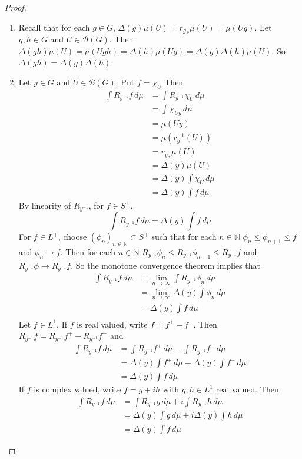 \documentclass[12pt]{amsart}
\theoremstyle{definition}
\newcommand{\Del}{\Delta}
\newcommand{\N}{\mathbb{N}}
\newcommand{\MB}{\mathcal{B}}
\newcommand{\dmu}{\, d \mu}
\newcommand{\limn}{\lim \limits_{n \rightarrow \infty}}
\newcommand{\seq}[2]{(#1_{#2})_{#2 \in \N}}
\begin{document}
	\begin{proof}\
		\begin{enumerate}
			\item Recall that for each $g \in G$, $\Del(g)\mu(U) = {r_g}_*\mu(U) = \mu(Ug)$. Let $g, h \in G$ and $U \in \MB(G)$. Then $\Del(gh)\mu(U) = \mu(Ugh) = \Del(h)\mu(Ug) = \Del(g) \Del(h)\mu(U)$. So $\Del(gh) = \Del(g) \Del(h)$.
			\item Let $y \in G$ and $U \in \MB(G)$. Put $f = \chi_U$ Then 
			\begin{align*}
				\int R_{y^{-1}} f \dmu 
				& = \int R_{y^{-1}} \chi_U \dmu \\
				& = \int \chi_{Uy} \dmu \\
				& = \mu(Uy) \\
				&= \mu(r_y^{-1}(U)) \\
				&= {r_y}_* \mu(U) \\
				& = \Del(y) \mu(U) \\
				& = \Del(y)  \int \chi_U \dmu \\
				&= \Del(y)  \int f \dmu
			\end{align*}
			By linearity of $R_{y^{-1}}$, for $f \in S^+$, $$\int R_{y^{-1}} f \dmu = \Del(y) \int f \dmu$$
			For $f \in L^+$, choose $\seq{\phi}{n} \subset S^+$ such that for each $n \in \N$ $\phi_n \leq \phi_{n+1} \leq f$ and $\phi_n \rightarrow f$. Then for each $n \in \N$ $R_{y^{-1}} \phi_n \leq R_{y^{-1}} \phi_{n+1} \leq R_{y^{-1}} f$ and $R_{y^{-1}} \phi \rightarrow R_{y^{-1}} f$. So the monotone convergence theorem implies that 
			\begin{align*}
				\int R_{y^{-1}} f \dmu 
				& = \limn \int R_{y^{-1}} \phi_n \dmu \\
				& = \limn \Del(y) \int \phi_n \dmu \\
				& = \Del(y) \int f \dmu \\
			\end{align*}
			Let $f \in L^1$. If $f$ is real valued, write $f = f^+ - f^-$. Then $R_{y^{-1}} f = R_{y^{-1}} f^+ - R_{y^{-1}} f^-$ and 
			\begin{align*}
				\int R_{y^{-1}} f \dmu 
				& = \int R_{y^{-1}} f^+ \dmu - \int R_{y^{-1}} f^- \dmu \\
				& = \Del(y) \int f^+ \dmu - \Del(y) \int f^- \dmu \\
				& = \Del(y) \int f \dmu
			\end{align*}
			If $f$ is complex valued, write $f = g + ih$ with $g, h \in L^1$ real valued. Then 
			\begin{align*}
				\int R_{y^{-1}} f \dmu 
				& = \int R_{y^{-1}} g \dmu + i \int R_{y^{-1}} h \dmu \\
				& = \Del(y) \int g \dmu +i \Del(y) \int h \dmu \\
				& = \Del(y) \int f \dmu
			\end{align*}
		\end{enumerate}
	\end{proof}
\end{document}
